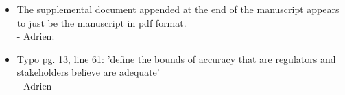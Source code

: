 \documentclass[12pt]{paper}
\begin{document}
{\begin{itemize}
{\color{red} Additional text has been added to the discussion describing how the results of the study were used to assess risk, and also emphasising that these results are case specific and should not be generalised to other types of genetic control technology (in response to the first comment from reviewer 2). The text also describes how the risk assessment was designed to provide an independent body of evidence that was made publicly available, and therefore available to any relevant national biosafety authorities, in May 2018. We cannot tell, however, if the assessment was actually used by the relevant biosafety authorities in Burkina Faso as we do not know what information they used during their decision making process.}
\item  The supplemental document appended at the end of the manuscript appears to just be the manuscript in pdf format.\\
{\color{red} - Adrien:}
\item  Typo pg. 13, line 61: 'define the bounds of accuracy that are regulators and stakeholders believe are adequate'\\
{\color{red} - Adrien}
\end{itemize}
}
~\\
~\\

\newpage
\end{document}
